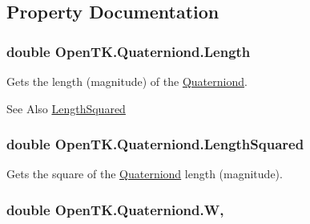\subsection{Property Documentation}
\hypertarget{struct_open_t_k_1_1_quaterniond_a8759a8c86b72c93aed6739c00b076cf3}{
\subsubsection[{Length}]{\setlength{\rightskip}{0pt plus 5cm}double Open\-T\-K.\-Quaterniond.\-Length\hspace{0.3cm}{\ttfamily [get]}}}\label{struct_open_t_k_1_1_quaterniond_a8759a8c86b72c93aed6739c00b076cf3}


Gets the length (magnitude) of the \hyperlink{struct_open_t_k_1_1_quaterniond}{Quaterniond}. 

\begin{DoxySeeAlso}{See Also}
\hyperlink{struct_open_t_k_1_1_quaterniond_a3a3405ecb859e0bec87c04f68ea81583}{Length\-Squared}


\end{DoxySeeAlso}
\hypertarget{struct_open_t_k_1_1_quaterniond_a3a3405ecb859e0bec87c04f68ea81583}{
\subsubsection[{Length\-Squared}]{\setlength{\rightskip}{0pt plus 5cm}double Open\-T\-K.\-Quaterniond.\-Length\-Squared\hspace{0.3cm}{\ttfamily [get]}}}\label{struct_open_t_k_1_1_quaterniond_a3a3405ecb859e0bec87c04f68ea81583}


Gets the square of the \hyperlink{struct_open_t_k_1_1_quaterniond}{Quaterniond} length (magnitude). 

\hypertarget{struct_open_t_k_1_1_quaterniond_a6407599296d528ce64964114eb7d6745}{
\subsubsection[{W}]{\setlength{\rightskip}{0pt plus 5cm}double Open\-T\-K.\-Quaterniond.\-W\hspace{0.3cm}{\ttfamily [get]}, {\ttfamily [set]}}}\label{struct_open_t_k_1_1_quaterniond_a6407599296d528ce64964114eb7d6745}



